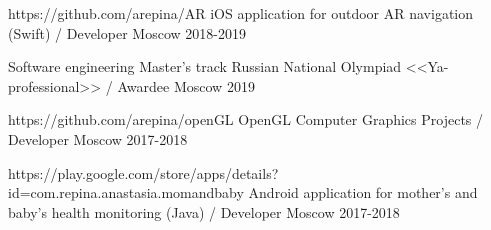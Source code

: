 


\vspace{0cm}\begin{cventries}

\cventry
{https://github.com/arepina/AR} %
{iOS application for outdoor AR navigation  (Swift) / Developer} %
{Moscow} %
{2018-2019} %
{}

\cventry
{Software engineering Master's track} %
{Russian National Olympiad <<Ya-professional>> / Awardee} %
{Moscow} %
{2019} %
{}	
	

\cventry
{https://github.com/arepina/openGL} %
{OpenGL Computer Graphics Projects / Developer} %
{Moscow} %
{2017-2018} %
{}
		
	
\cventry
{https://play.google.com/store/apps/details?id=com.repina.anastasia.momandbaby} %
{Android application for mother's and baby's health monitoring (Java) / Developer} %
{Moscow} %
{2017-2018} %
{}
	




\end{cventries}
